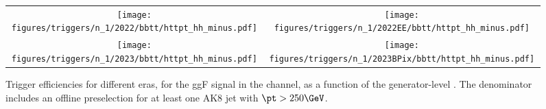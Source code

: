 
    \begin{figure}[H]
        \centering
        \begin{tabular}{cc}
            \texttt{[image: figures/triggers/n\_1/2022/bbtt/httpt\_hh\_minus.pdf]} &
            \texttt{[image: figures/triggers/n\_1/2022EE/bbtt/httpt\_hh\_minus.pdf]} \\[1ex]
            \texttt{[image: figures/triggers/n\_1/2023/bbtt/httpt\_hh\_minus.pdf]} &
            \texttt{[image: figures/triggers/n\_1/2023BPix/bbtt/httpt\_hh\_minus.pdf]}
            \label{fig}
        \end{tabular}
\caption{Trigger efficiencies for different eras, for the ggF \HHbbtt signal in the \tauhh channel, as a function of the generator-level \htata \pt. The denominator includes an offline preselection for at least one AK8 jet with $\pt > 250\GeV$.}
\label{fig:triggers_n-1_bbtt_hh_httpt}
\end{figure}
